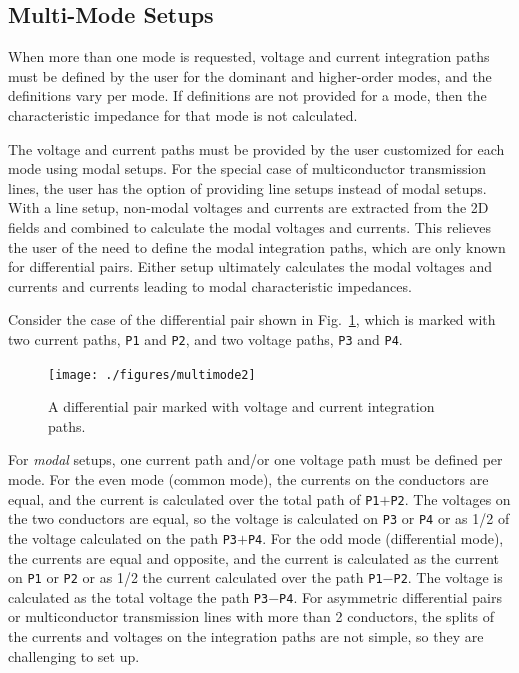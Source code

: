 \documentclass[titlepage]{article}
\renewcommand\_{\textunderscore\linebreak[1]}
\begin{document}
\subsection{Multi-Mode Setups}

When more than one mode is requested, voltage and current integration paths must be defined by the user for the dominant and higher-order modes, and the definitions vary per mode.  If definitions are not provided for a mode, then the characteristic impedance for that mode is not calculated.

The voltage and current paths must be provided by the user customized for each mode using modal setups.  For the special case of multiconductor transmission lines, the user has the option of providing line setups instead of modal setups.  With a line setup, non-modal voltages and currents are extracted from the 2D fields and combined to calculate the modal voltages and currents.  This relieves the user of the need to define the modal integration paths, which are only known for differential pairs.  Either setup ultimately calculates the modal voltages and currents and currents leading to modal characteristic impedances.

Consider the case of the differential pair shown in Fig.~\ref{fig:multimode}, which is marked with two current paths, \texttt{\_P1} and \texttt{\_P2}, and two voltage paths, \texttt{\_P3} and \texttt{\_P4}.
\begin{figure}
  \centering
  \texttt{[image: ./figures/multimode2]}
  \caption{A differential pair marked with voltage and current integration paths.}
  \label{fig:multimode}
\end{figure}
For \textit{modal} setups, one current path and/or one voltage path must be defined per mode.  For the even mode (common mode), the currents on the conductors are equal, and the current is calculated over the total path of \texttt{\_P1$+$\_P2}.  The voltages on the two conductors are equal, so the voltage is calculated on \texttt{\_P3} or \texttt{\_P4} or as 1/2 of the voltage calculated on the path \texttt{\_P3$+$\_P4}.  For the odd mode (differential mode), the currents are equal and opposite, and the current is calculated as the current on \texttt{\_P1} or \texttt{\_P2} or as 1/2 the current calculated over the path \texttt{\_P1$-$\_P2}.  The voltage is calculated as the total voltage the path \texttt{\_P3$-$\_P4}.  For asymmetric differential pairs or multiconductor transmission lines with more than 2 conductors, the splits of the currents and voltages on the integration paths are not simple, so they are challenging to set up.
\end{document}
